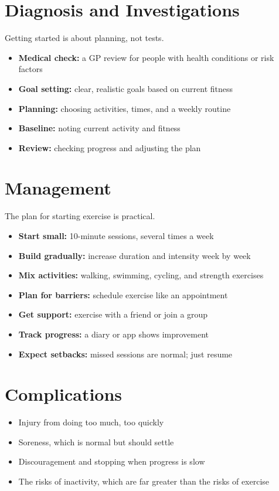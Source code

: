 \section*{Diagnosis and Investigations}
Getting started is about planning, not tests.
\begin{itemize}
    \item \textbf{Medical check:} a GP review for people with health conditions or risk factors
    \item \textbf{Goal setting:} clear, realistic goals based on current fitness
    \item \textbf{Planning:} choosing activities, times, and a weekly routine
    \item \textbf{Baseline:} noting current activity and fitness
    \item \textbf{Review:} checking progress and adjusting the plan
\end{itemize}

\section*{Management}
The plan for starting exercise is practical.
\begin{itemize}
    \item \textbf{Start small:} 10-minute sessions, several times a week
    \item \textbf{Build gradually:} increase duration and intensity week by week
    \item \textbf{Mix activities:} walking, swimming, cycling, and strength exercises
    \item \textbf{Plan for barriers:} schedule exercise like an appointment
    \item \textbf{Get support:} exercise with a friend or join a group
    \item \textbf{Track progress:} a diary or app shows improvement
    \item \textbf{Expect setbacks:} missed sessions are normal; just resume
\end{itemize}

\section*{Complications}
\begin{itemize}
    \item Injury from doing too much, too quickly
    \item Soreness, which is normal but should settle
    \item Discouragement and stopping when progress is slow
    \item The risks of inactivity, which are far greater than the risks of exercise
\end{itemize}

